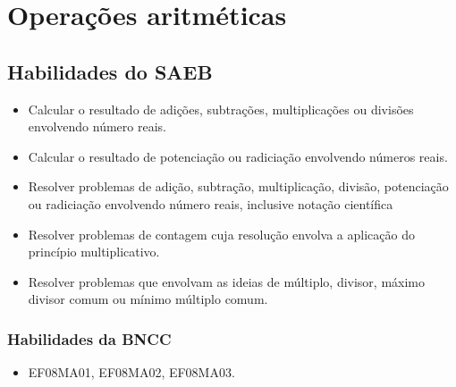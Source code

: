 




\chapter{Operações aritméticas}

\section*{Habilidades do SAEB}

\begin{itemize}
  \item Calcular o resultado de adições, subtrações,
multiplicações ou divisões envolvendo número reais.
\item
  Calcular o resultado de potenciação ou radiciação envolvendo números
  reais.
\item
  Resolver problemas de adição, subtração, multiplicação, divisão,
  potenciação ou radiciação envolvendo número reais, inclusive notação
  científica
\item
  Resolver problemas de contagem cuja resolução envolva a aplicação do
  princípio multiplicativo.
\item
  Resolver problemas que envolvam as ideias de múltiplo, divisor, máximo
  divisor comum ou mínimo múltiplo comum.
\end{itemize}

\subsection{Habilidades da BNCC}

\begin{itemize}
\item EF08MA01, EF08MA02, EF08MA03.
\end{itemize}

